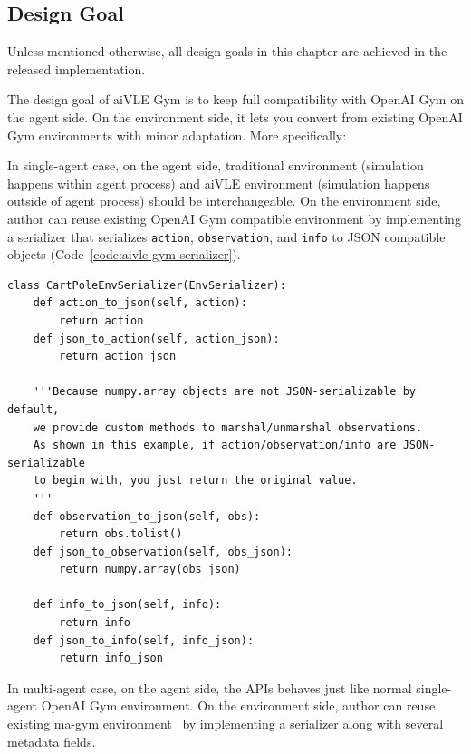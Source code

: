\subsection{Design Goal}
Unless mentioned otherwise, all design goals in this chapter are achieved in the released implementation. 

The design goal of aiVLE Gym is to keep full compatibility with OpenAI Gym on the agent side. On the environment side, it lets you convert from existing OpenAI Gym environments with minor adaptation. More specifically:

In single-agent case, on the agent side, traditional environment (simulation happens within agent process) and aiVLE environment (simulation happens outside of agent process) should be interchangeable. On the environment side, author can reuse existing OpenAI Gym compatible environment by implementing a serializer that serializes \texttt{action}, \texttt{observation}, and \texttt{info} to JSON compatible objects (Code~\ref{code:aivle-gym-serializer}).

\begin{code}
\begin{verbatim}
class CartPoleEnvSerializer(EnvSerializer):
    def action_to_json(self, action):
        return action
    def json_to_action(self, action_json):
        return action_json

    '''Because numpy.array objects are not JSON-serializable by default,
    we provide custom methods to marshal/unmarshal observations.
    As shown in this example, if action/observation/info are JSON-serializable
    to begin with, you just return the original value.
    '''
    def observation_to_json(self, obs):
        return obs.tolist()
    def json_to_observation(self, obs_json):
        return numpy.array(obs_json)

    def info_to_json(self, info):
        return info
    def json_to_info(self, info_json):
        return info_json
\end{verbatim}
\label{code:aivle-gym-serializer}
\end{code}

In multi-agent case, on the agent side, the APIs behaves just like normal single-agent OpenAI Gym environment. On the environment side, author can reuse existing ma-gym environment~\parencite{magym} by implementing a serializer along with several metadata fields. 

